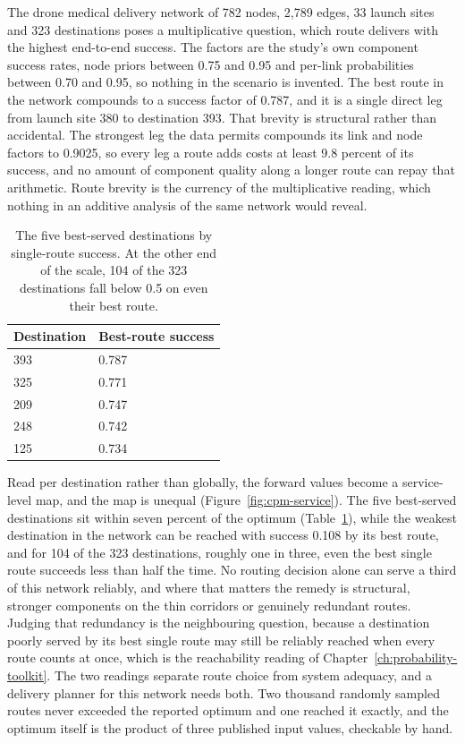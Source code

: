 \documentclass[12pt]{report}
\begin{document}
The drone medical delivery network of 782 nodes, 2,789 edges, 33 launch
sites and 323 destinations poses a multiplicative question, which route
delivers with the highest end-to-end success. The factors are the study's
own component success rates, node priors between 0.75 and 0.95 and
per-link probabilities between 0.70 and 0.95, so nothing in the scenario
is invented. The best route in the network compounds to a success factor
of 0.787, and it is a single direct leg from launch site 380 to
destination 393. That brevity is structural rather than accidental. The
strongest leg the data permits compounds its link and node factors to
0.9025, so every leg a route adds costs at least 9.8 percent of its
success, and no amount of component quality along a longer route can
repay that arithmetic. Route brevity is the currency of the
multiplicative reading, which nothing in an additive analysis of the same
network would reveal.

\begin{table}[htbp]
\centering
\caption{The five best-served destinations by single-route success. At
the other end of the scale, 104 of the 323 destinations fall below 0.5 on
even their best route.}
\label{tab:cpm-drone}
\small
\renewcommand{\arraystretch}{1.15}
\begin{tabular}{ll}
\toprule
Destination & Best-route success \\
\midrule
393 & 0.787 \\
325 & 0.771 \\
209 & 0.747 \\
248 & 0.742 \\
125 & 0.734 \\
\bottomrule
\end{tabular}
\end{table}

Read per destination rather than globally, the forward values become a
service-level map, and the map is unequal (Figure~\ref{fig:cpm-service}). The five best-served
destinations sit within seven percent of the optimum
(Table~\ref{tab:cpm-drone}), while the weakest destination in the network
can be reached with success 0.108 by its best route, and for 104 of the
323 destinations, roughly one in three, even the best single route
succeeds less than half the time. No routing decision alone can serve a
third of this network reliably, and where that matters the remedy is
structural, stronger components on the thin corridors or genuinely
redundant routes. Judging that redundancy is the neighbouring question,
because a destination poorly served by its best single route may still be
reliably reached when every route counts at once, which is the
reachability reading of Chapter~\ref{ch:probability-toolkit}. The two
readings separate route choice from system adequacy, and a delivery
planner for this network needs both. Two thousand randomly sampled routes
never exceeded the reported optimum and one reached it exactly, and the
optimum itself is the product of three published input values, checkable
by hand.
\end{document}
